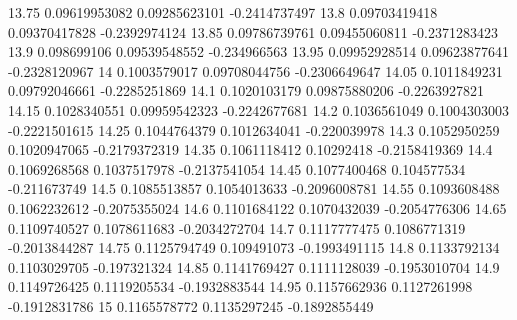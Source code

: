 {13.75 0.09619953082 0.09285623101 -0.2414737497
13.8 0.09703419418 0.09370417828 -0.2392974124
13.85 0.09786739761 0.09455060811 -0.2371283423
13.9 0.098699106 0.09539548552 -0.234966563
13.95 0.09952928514 0.09623877641 -0.2328120967
14 0.1003579017 0.09708044756 -0.2306649647
14.05 0.1011849231 0.09792046661 -0.2285251869
14.1 0.1020103179 0.09875880206 -0.2263927821
14.15 0.1028340551 0.09959542323 -0.2242677681
14.2 0.1036561049 0.1004303003 -0.2221501615
14.25 0.1044764379 0.1012634041 -0.220039978
14.3 0.1052950259 0.1020947065 -0.2179372319
14.35 0.1061118412 0.10292418 -0.2158419369
14.4 0.1069268568 0.1037517978 -0.2137541054
14.45 0.1077400468 0.104577534 -0.211673749
14.5 0.1085513857 0.1054013633 -0.2096008781
14.55 0.1093608488 0.1062232612 -0.2075355024
14.6 0.1101684122 0.1070432039 -0.2054776306
14.65 0.1109740527 0.1078611683 -0.2034272704
14.7 0.1117777475 0.1086771319 -0.2013844287
14.75 0.1125794749 0.109491073 -0.1993491115
14.8 0.1133792134 0.1103029705 -0.197321324
14.85 0.1141769427 0.1111128039 -0.1953010704
14.9 0.1149726425 0.1119205534 -0.1932883544
14.95 0.1157662936 0.1127261998 -0.1912831786
15 0.1165578772 0.1135297245 -0.1892855449
}\signedfrequency

